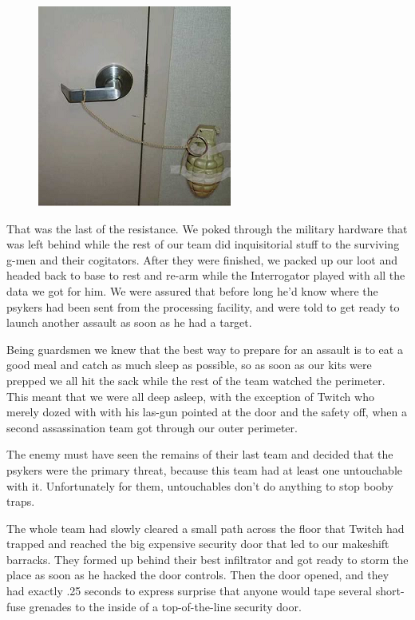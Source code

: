 \begin{figure}
\begin{center}
	\includegraphics[width=\figwidth]{pics/3/17.png}
\end{center}
\end{figure}
That was the last of the resistance. 
We poked through the military hardware that was left behind while the rest of our team did inquisitorial stuff to the surviving g-men and their cogitators. 
After they were finished, we packed up our loot and headed back to base to rest and re-arm while the Interrogator played with all the data we got for him. 
We were assured that before long he’d know where the psykers had been sent from the processing facility, and were told to get ready to launch another assault as soon as he had a target. 

Being guardsmen we knew that the best way to prepare for an assault is to eat a good meal and catch as much sleep as possible, so as soon as our kits were prepped we all hit the sack while the rest of the team watched the perimeter. 
This meant that we were all deep asleep, with the exception of Twitch who merely dozed with with his las-gun pointed at the door and the safety off, when a second assassination team got through our outer perimeter.

The enemy must have seen the remains of their last team and decided that the psykers were the primary threat, because this team had at least one untouchable with it. 
Unfortunately for them, untouchables don’t do anything to stop booby traps. 

The whole team had slowly cleared a small path across the floor that Twitch had trapped and reached the big expensive security door that led to our makeshift barracks.
They formed up behind their best infiltrator and got ready to storm the place as soon as he hacked the door controls. 
Then the door opened, and they had exactly .25 seconds to express surprise that anyone would tape several short-fuse grenades to the inside of a top-of-the-line security door.



